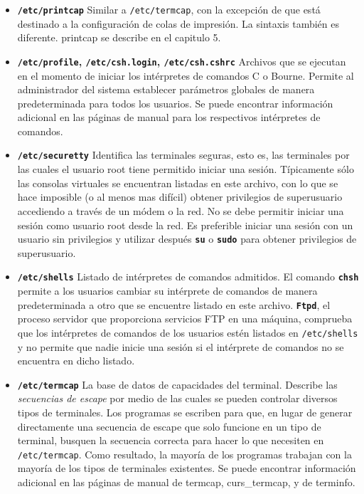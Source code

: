 \documentclass[12pt]{article}
\begin{document}
\begin{itemize}
	
	\item \textbf{\texttt{/etc/printcap}}
	 Similar a \texttt{/etc/termcap}, con la
	excepción de que está destinado a la configuración de colas de
	impresión. La sintaxis también es diferente.  printcap se describe en el
	capitulo 5.   
	

	
	\item \textbf{\texttt{/etc/profile},
	\texttt{/etc/csh.login},
	\texttt{/etc/csh.cshrc}}  Archivos
	que se ejecutan en el momento de iniciar los intérpretes de comandos C o
	Bourne. Permite al administrador del sistema establecer parámetros
	globales de manera predeterminada para todos los usuarios. Se puede encontrar
	información adicional 	en las páginas de manual para los respectivos
	intérpretes de comandos.  



	\item \textbf{\texttt{/etc/securetty}}
	 Identifica las terminales seguras, esto es, las
	terminales por las cuales el usuario root tiene permitido iniciar una
	sesión. Típicamente sólo las consolas virtuales se encuentran listadas
	en este archivo, con lo que se hace imposible (o al menos mas difícil)
	obtener privilegios de superusuario accediendo a través de un módem o la
	red. No se debe permitir iniciar una sesión como usuario root desde la
	red. Es preferible iniciar una sesión con un usuario sin privilegios y
	utilizar después \texttt{\textbf{su}} o \texttt{\textbf{sudo}} para
	obtener privilegios de superusuario.  



	\item \textbf{\texttt{/etc/shells}}
	 Listado de intérpretes de comandos admitidos.  El
	comando \texttt{\textbf{chsh}} permite a los usuarios cambiar su
	intérprete de comandos de manera predeterminada a otro que se encuentre listado en
	este archivo. \texttt{\textbf{Ftpd}}, el proceso servidor que
	proporciona 	servicios FTP en una máquina, comprueba que los
	intérpretes de comandos 		de los usuarios estén listados
	en \texttt{/etc/shells} y no 		permite que
	nadie inicie una sesión si el intérprete de comandos no se encuentra en
	dicho listado.  

	
	\item \textbf{\texttt{/etc/termcap}}
	 La base de datos de capacidades del terminal. Describe
	las \textit{secuencias de escape} por medio de 		las
	cuales se pueden controlar diversos tipos de terminales. Los programas
	se escriben para que, en lugar de generar directamente una secuencia de
	escape que solo funcione en un tipo de terminal, busquen la secuencia
	correcta para hacer lo que necesiten en
	\texttt{/etc/termcap}. 		Como resultado, la
	mayoría de los programas trabajan con la mayoría de los
	tipos de terminales existentes. Se puede encontrar información adicional
	en 	las páginas de manual de termcap, curs\_termcap, y de terminfo.
	

 \end{itemize} 
    
\end{document}
